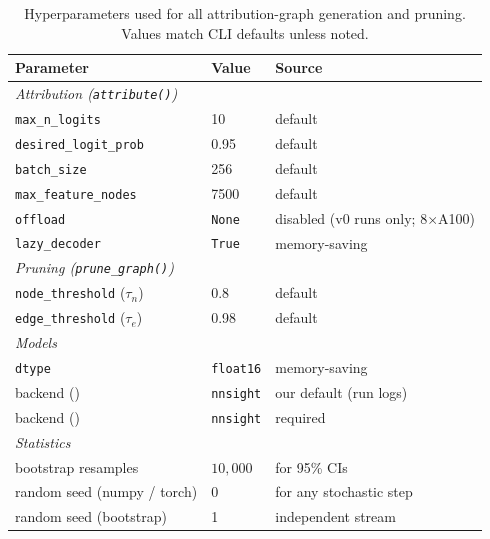 \begin{table}[h]
\centering
\small
\caption{Hyperparameters used for all attribution-graph generation
and pruning. Values match \circuittracer{} CLI defaults unless noted.}
\label{tab:hyperparams}
\begin{tabular}{lll}
\toprule
\textbf{Parameter} & \textbf{Value} & \textbf{Source} \\
\midrule
\multicolumn{3}{l}{\textit{Attribution (\texttt{attribute()})}} \\
\quad \texttt{max\_n\_logits}            & 10                         & default \\
\quad \texttt{desired\_logit\_prob}      & 0.95                       & default \\
\quad \texttt{batch\_size}               & 256                        & default \\
\quad \texttt{max\_feature\_nodes}       & 7500                       & default \\
\quad \texttt{offload}                   & \texttt{None}              & disabled (v0 runs only; 8$\times$A100) \\
\quad \texttt{lazy\_decoder}             & \texttt{True}              & memory-saving \\
\midrule
\multicolumn{3}{l}{\textit{Pruning (\texttt{prune\_graph()})}} \\
\quad \texttt{node\_threshold} ($\tau_n$)& 0.8                        & default \\
\quad \texttt{edge\_threshold} ($\tau_e$)& 0.98                       & default \\
\midrule
\multicolumn{3}{l}{\textit{Models}} \\
\quad \texttt{dtype}                     & \texttt{float16}           & memory-saving \\
\quad backend (\qwen{})                  & \texttt{nnsight}           & our default (run logs) \\
\quad backend (\gemma{})                 & \texttt{nnsight}           & required \\
\midrule
\multicolumn{3}{l}{\textit{Statistics}} \\
\quad bootstrap resamples                & $10{,}000$                     & for 95\% CIs \\
\quad random seed (numpy / torch)        & 0                          & for any stochastic step \\
\quad random seed (bootstrap)            & 1                          & independent stream \\
\bottomrule
\end{tabular}
\end{table}

